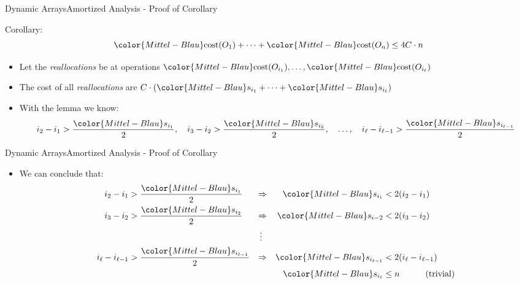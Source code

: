 \begin{frame}{Dynamic Arrays}{Amortized Analysis - Proof of Corollary}
  \begin{block}{Corollary:}
    \begin{displaymath}
      {\color{Mittel-Blau}\mathrm{cost}(O_1)}+\dots+
      {\color{Mittel-Blau}\mathrm{cost}(O_n)} \leq 4 C \cdot n
    \end{displaymath}
  \end{block}
  \begin{itemize}
    \item
      Let the \textit{reallocations} be at operations
      \begin{math}
        {\color{Mittel-Blau}\mathrm{cost}(O_{i_1})},\dots,
        {\color{Mittel-Blau}\mathrm{cost}(O_{i_\ell})}
      \end{math}
    \item
      The {\color{Mittel-Blau}cost} of all \textit{reallocations} are
      \begin{math}
        C \cdot \left(
          {\color{Mittel-Blau}s_{i_1}}+\dots+{\color{Mittel-Blau}s_{i_\ell}}
        \right)
      \end{math}
    \item
      With the lemma we know:
      \begin{displaymath}
        i_2-i_1 > \frac{\color{Mittel-Blau}s_{i_1}}{2},\hspace{1.0em}
        i_3-i_2 > \frac{\color{Mittel-Blau}s_{i_2}}{2},\hspace{1.0em}
        \dotsc,\hspace{1.0em}
        i_\ell-i_{\ell-1} > \frac{\color{Mittel-Blau}s_{i_{\ell-1}}}{2}
      \end{displaymath}
  \end{itemize}
\end{frame}


\begin{frame}{Dynamic Arrays}{Amortized Analysis - Proof of Corollary}
  \begin{itemize}
    \item
      We can conclude that:
      \begin{align*}
        i_2-i_1 &> \frac{\color{Mittel-Blau}s_{i_1}}{2} &
        \Rightarrow &&
        {\color{Mittel-Blau}s_{i_1}} &< 2 (i_2 - i_1)\\
        i_3-i_2 &> \frac{\color{Mittel-Blau}s_{i_2}}{2} &
        \Rightarrow &&
        {\color{Mittel-Blau}s_{i-2}} &< 2 (i_3 - i_2)\\
        {} & {} & \vdots\;\;\\
        i_\ell-i_{\ell-1} &> \frac{\color{Mittel-Blau}s_{i_{\ell-1}}}{2} &
        \Rightarrow &&
        {\color{Mittel-Blau}s_{i_{\ell-1}}} &< 2 (i_\ell - i_{\ell-1})\\
        {} & {} & {} &&
        {\color{Mittel-Blau}s_{i_\ell}} &\leq n
        \hspace*{3.0em}\text{(trivial)}
      \end{align*}
  \end{itemize}
\end{frame}

